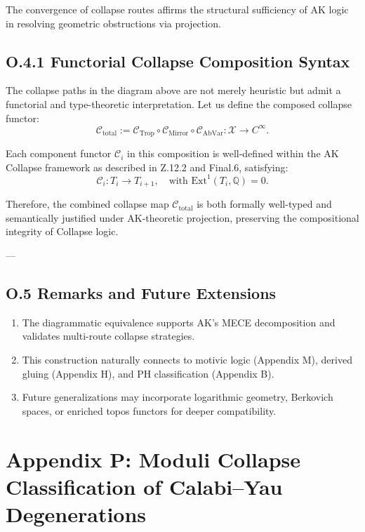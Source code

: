 \documentclass[11pt]{article}
\begin{document}
\begin{axiom}
\begin{axiom}
{{The convergence of collapse routes affirms the structural sufficiency of AK logic in resolving geometric obstructions via projection.


\subsection*{O.4.1 Functorial Collapse Composition Syntax}

The collapse paths in the diagram above are not merely heuristic but admit a functorial and type-theoretic interpretation.  
Let us define the composed collapse functor:
\[
\mathcal{C}_{\mathrm{total}} := \mathcal{C}_{\mathrm{Trop}} \circ \mathcal{C}_{\mathrm{Mirror}} \circ \mathcal{C}_{\mathrm{AbVar}} : \mathcal{X} \to C^\infty.
\]

Each component functor \( \mathcal{C}_i \) in this composition is well-defined within the AK Collapse framework as described in Z.12.2 and Final.6, satisfying:
\[
\mathcal{C}_i : T_i \to T_{i+1}, \quad \text{with } \mathrm{Ext}^1(T_i, \mathbb{Q}) = 0.
\]

Therefore, the combined collapse map \( \mathcal{C}_{\mathrm{total}} \) is both formally well-typed and semantically justified under AK-theoretic projection, preserving the compositional integrity of Collapse logic.


---


\subsection*{O.5 Remarks and Future Extensions}

\begin{enumerate}
  \item The diagrammatic equivalence supports AK’s MECE decomposition and validates multi-route collapse strategies.
  \item This construction naturally connects to motivic logic (Appendix M), derived gluing (Appendix H), and PH classification (Appendix B).
  \item Future generalizations may incorporate logarithmic geometry, Berkovich spaces, or enriched topos functors for deeper compatibility.
\end{enumerate}


\section*{Appendix P: Moduli Collapse Classification of Calabi–Yau Degenerations}

}}
\end{axiom}
\end{axiom}
\end{document}
